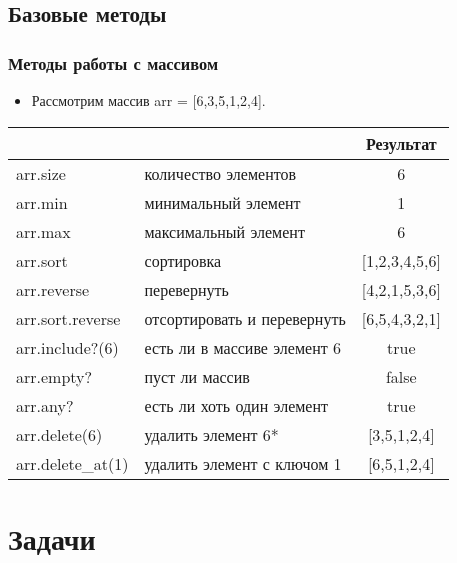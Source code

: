 \documentclass[compress,red]{beamer}
\begin{document}
\subsection{Базовые методы}
\begin{frame}[fragile]
  \frametitle{Методы работы с массивом}
		\begin{itemize}
  	  \item Рассмотрим массив arr = [6,3,5,1,2,4].
		\end{itemize}
		
		\begin{tabular}{|l|l|c|}
		\hline
		\centering{\textbf{Метод}} & \centering{\textbf{Описание}} & \textbf{Результат}\\
		\hline
		arr.size & количество элементов & 6 \\
		\hline
		arr.min & минимальный элемент & 1 \\
		\hline
		arr.max & максимальный элемент & 6 \\
		\hline
		arr.sort & сортировка & [1,2,3,4,5,6] \\
		\hline
		arr.reverse & перевернуть & [4,2,1,5,3,6] \\
		\hline
		arr.sort.reverse & отсортировать и перевернуть & [6,5,4,3,2,1] \\
		\hline
		arr.include?(6) & есть ли в массиве элемент 6 & true \\
		\hline
		arr.empty? & пуст ли массив & false \\
		\hline
		arr.any? & есть ли хоть один элемент & true \\
		\hline
		arr.delete(6) & удалить элемент 6* & [3,5,1,2,4] \\
		\hline
		arr.delete\_at(1) & удалить элемент с ключом 1 & [6,5,1,2,4] \\
		\hline
		\end{tabular}
		
\end{frame}

\section{Задачи}
\end{document}
